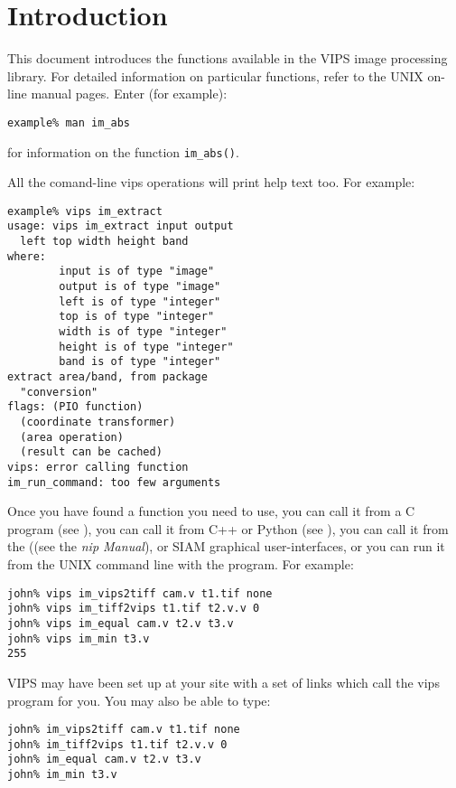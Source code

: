\section{Introduction}

This document introduces the functions available in the VIPS image
processing library.  For detailed information on particular functions,
refer to the UNIX on-line manual pages. Enter (for example):

\begin{verbatim}
example% man im_abs   
\end{verbatim}

for information on the function \verb+im_abs()+.

All the comand-line vips operations will print help text too. For example:

\begin{verbatim}
example% vips im_extract
usage: vips im_extract input output 
  left top width height band
where:
        input is of type "image"
        output is of type "image"
        left is of type "integer"
        top is of type "integer"
        width is of type "integer"
        height is of type "integer"
        band is of type "integer"
extract area/band, from package 
  "conversion"
flags: (PIO function) 
  (coordinate transformer) 
  (area operation) 
  (result can be cached)
vips: error calling function
im_run_command: too few arguments
\end{verbatim}

Once you have found a function you need to use, you can call it from a C
program (see ), you can call
it from C++ or Python (see ), you can call
it from the \nip{} ((see the \emph{nip Manual}), or SIAM graphical
user-interfaces, or you can run it from the UNIX command line with the
\vips{} program. For example:

\begin{verbatim}
john% vips im_vips2tiff cam.v t1.tif none
john% vips im_tiff2vips t1.tif t2.v.v 0
john% vips im_equal cam.v t2.v t3.v
john% vips im_min t3.v
255   
\end{verbatim}

VIPS may have been set up at your site with a set of links which call the
vips program for you. You may also be able to type:

\begin{verbatim}
john% im_vips2tiff cam.v t1.tif none
john% im_tiff2vips t1.tif t2.v.v 0
john% im_equal cam.v t2.v t3.v
john% im_min t3.v
\end{verbatim}

